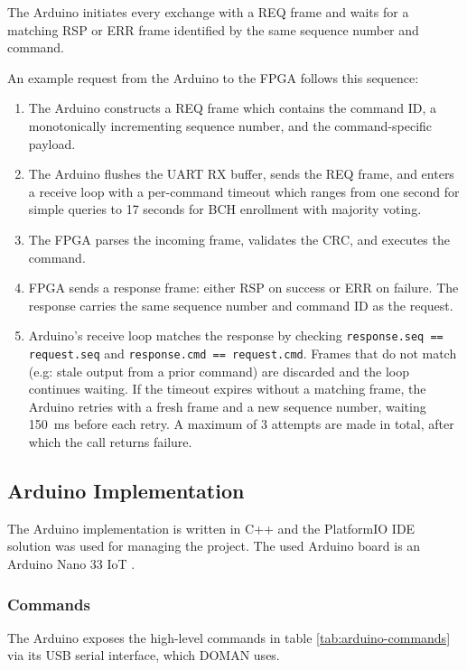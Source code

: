 The Arduino initiates every exchange with a REQ frame and waits for a matching RSP or ERR frame identified by the same sequence number and command. 

An example request from the Arduino to the FPGA follows this sequence:
\begin{enumerate}
      \item The Arduino constructs a REQ frame which contains the command ID,
      a monotonically incrementing sequence number, and the command-specific payload.

      \item The Arduino flushes the UART RX buffer, sends the REQ frame, and enters a
      receive loop with a per-command timeout which ranges from one second for simple queries to 17 seconds for BCH enrollment with majority voting.

      \item The FPGA parses the incoming frame, validates the CRC, and executes the command.

      \item FPGA sends a response frame: either RSP on success or ERR on failure. The response carries the same sequence number
      and command ID as the request.

      \item Arduino's receive loop matches the response by checking
      \texttt{response.seq == request.seq} and \texttt{response.cmd == request.cmd}.
      Frames that do not match (e.g: stale output from a prior command) are discarded and
      the loop continues waiting. If the timeout expires without a matching frame, the
      Arduino retries with a fresh frame and a new sequence number, waiting
      150~ms before each retry. A maximum of 3 attempts are made in total, after which the call returns failure.
  \end{enumerate}

\subsection{Arduino Implementation}
The Arduino implementation is written in C++ and the PlatformIO IDE solution \cite{platformio_ide} was used for managing the project. The used Arduino board is an Arduino Nano 33 IoT \cite{arduino_nano_33_iot}.

\subsubsection{Commands}
The Arduino exposes the high-level commands in table \ref{tab:arduino-commands} via its USB serial interface, which DOMAN uses.

